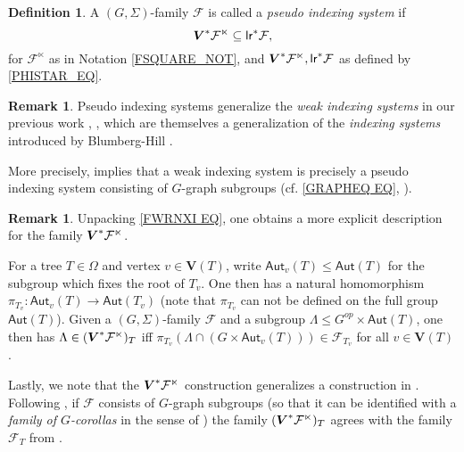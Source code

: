 \documentclass[a4paper,10pt
]{article}%
\numberwithin{equation}{section}
\numberwithin{figure}{section}
\theoremstyle{definition} %
\newtheorem{definition}[equation]{Definition}%
\newtheorem{remark}[equation]{Remark}%
\newcommand{\F}{\ensuremath{\mathcal F}}
\newcommand{\1}{\ensuremath{\mathbbm 1}}%
\begin{document}
\begin{definition}\label{PIS_DEF}
	A $(G,\Sigma)$-family $\F$ is called a \textit{pseudo indexing system} if
	\begin{equation}\label{PIS_EQ}
	\boldsymbol{V}^{\**} \F^\ltimes \subseteq \mathsf{lr}^{\**}\F,
	\end{equation}
	for $\F^\ltimes$ as in Notation \ref{FSQUARE_NOT},
	and
	$\boldsymbol{V}^{\**} \F^\ltimes, \mathsf{lr}^{\**}\F$
	as defined by \eqref{PHISTAR_EQ}.
\end{definition}



\begin{remark}
	Pseudo indexing systems generalize the
	\textit{weak indexing systems} in our previous work
	\cite[Def. 9.5]{Per18}, \cite[Def. 4.58]{BP21}, \cite[Def. 6.2]{BP20}
	which are themselves a generalization of the 
	\textit{indexing systems} introduced by Blumberg-Hill \cite[Def. 3.22]{BH15}.
	
	More precisely, \cite[Rem. 6.47]{BP21} implies that
	a weak indexing system is precisely a pseudo indexing system consisting of $G$-graph subgroups (cf. \eqref{GRAPHEQ EQ}, \cite[Def. 6.36]{BP21}).
\end{remark}



\begin{remark}
	Unpacking \eqref{FWRNXI EQ}, one obtains a more 
	explicit description for the family
	$\boldsymbol{V}^{\**}\F^\ltimes$.
	
	For a tree $T \in \Omega$
	and vertex $v \in \boldsymbol{V}(T)$, write 
	$\mathsf{Aut}_{v}(T) \leq \mathsf{Aut}(T)$ for the subgroup which fixes the root of $T_v$.
	One then has a natural homomorphism
	$\pi_{T_v} \colon \mathsf{Aut}_v(T) \to \mathsf{Aut}(T_v)$
	(note that $\pi_{T_v}$ can not be defined on the full group
	$\mathsf{Aut}(T)$).
	Given a $(G,\Sigma)$-family $\F$ and a subgroup $\Lambda \leq G^{op} \times \mathsf{Aut}(T)$,
	one then has
	$\Lambda \in (\boldsymbol{V}^{\**}\F^\ltimes)_T$ iff
	$\pi_{T_v}\left( \Lambda \cap (G \times \mathsf{Aut}_{v}(T)) \right) \in \F_{T_v}$
	for all $v \in \boldsymbol{V}(T)$.
	
	Lastly, we note that the $\boldsymbol{V}^{\**}\F^\ltimes$
	construction generalizes a construction in
	\cite{BP21}.
	Following \cite[Rem. 6.48]{BP21}, 
	if $\F$ consists of $G$-graph subgroups
	(so that it can be identified with a 
	\textit{family of $G$-corollas} in the sense of \cite[Def. 4.53]{BP21})
	the family $(\boldsymbol{V}^{\**}\F^\ltimes)_T$ agrees
	with the family $\F_T$ from \cite[Prop. 6.46]{BP21}.
\end{remark}
\end{document}

